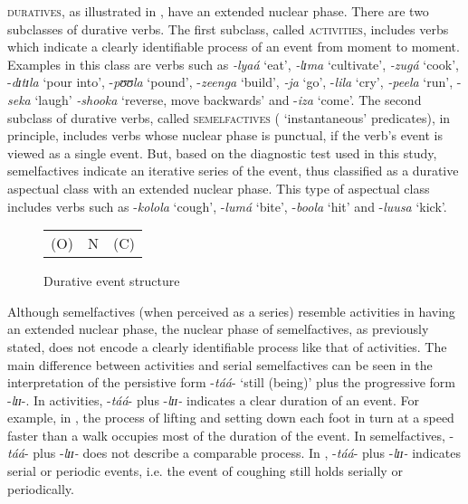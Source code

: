 \documentclass[output=paper,newtxmath,modfonts,nonflat,draftmode]{langsci/langscibook}
\begin{document}
\textsc{duratives}, as illustrated in , have an extended nuclear phase. There are two subclasses of durative verbs. The first subclass, called \textsc{activities}, includes verbs which indicate a clearly identifiable process of an event from moment to moment. Examples in this class are verbs such as \textit{-lyaá} ‘eat’, \textit{-lɪ}\textit{ma} ‘cultivate’, \textit{-zugá} ‘cook’, -\textit{dɪ}\textit{tɪ}\textit{la} ‘pour into’, -\textit{pʊʊ}\textit{la} ‘pound’, -\textit{zeenga} ‘build’, \textit{-ja} ‘go’, -\textit{lila} ‘cry’, \textit{-peela} ‘run’, -\textit{seka} ‘laugh’ \textit{-shooka} ‘reverse, move backwards’ and -\textit{iza} ‘come’. The second subclass of durative verbs, called \textsc{semelfactives} ( ‘instantaneous’ predicates), in principle, includes verbs whose nuclear phase is punctual, if the verb’s event is viewed as a single event. But, based on the diagnostic test used in this study, semelfactives indicate an iterative series of the event, thus classified as a durative aspectual class with an extended nuclear phase. This type of aspectual class includes verbs such as -\textit{kolola} ‘cough’, -\textit{lumá} ‘bite’, -\textit{boola} ‘hit’ and -\textit{luusa} ‘kick’. 

\begin{figure}
\caption{Durative event structure}
\label{fig:kanijo:6}
\begin{tabular}{c|c|c}
\cline{1-3}
(O) & N & (C)\\
\cline{1-3}
\end{tabular}
\end{figure} 

Although semelfactives (when perceived as a series) resemble activities in having an extended nuclear phase, the nuclear phase of semelfactives, as previously stated, does not encode a clearly identifiable process like that of activities. The main difference between activities and serial semelfactives can be seen in the interpretation of the persistive form -\textit{táá}- ‘still (being)’ plus the progressive form -\textit{lɪɪ}-. In activities, -\textit{táá}- plus -\textit{lɪɪ-} indicates a clear duration of an event. For example, in , the process of lifting and setting down each foot in turn at a speed faster than a walk occupies most of the duration of the event. In semelfactives, -\textit{táá}- plus -\textit{lɪɪ-} does not describe a comparable process. In , -\textit{táá}- plus -\textit{lɪɪ-} indicates serial or periodic events, i.e. the event of coughing still holds serially or periodically.
\end{document}
